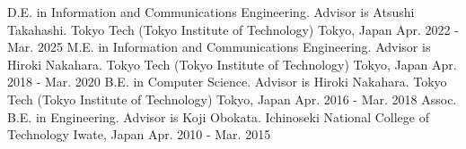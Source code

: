 \begin{cventries}
  \eduentry
    {D.E. in Information and Communications Engineering. Advisor is Atsushi Takahashi.} %
    {Tokyo Tech (Tokyo Institute of Technology)} %
    {Tokyo, Japan} %
    {Apr. 2022 - Mar. 2025} %
  \eduentry
    {M.E. in Information and Communications Engineering. Advisor is Hiroki Nakahara.} %
    {Tokyo Tech (Tokyo Institute of Technology)} %
    {Tokyo, Japan} %
    {Apr. 2018 - Mar. 2020} %
  \eduentry
    {B.E. in Computer Science. Advisor is Hiroki Nakahara.} %
    {Tokyo Tech (Tokyo Institute of Technology)} %
    {Tokyo, Japan} %
    {Apr. 2016 - Mar. 2018} %
  \eduentry
    {Assoc. B.E. in Engineering. Advisor is Koji Obokata.} %
    {Ichinoseki National College of Technology} %
    {Iwate, Japan} %
    {Apr. 2010 - Mar. 2015} %
\end{cventries}
